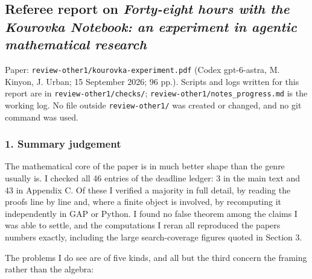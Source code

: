 \hypertarget{review-md-referee-report-on-forty-eight-hours-with-the-kourovka-notebook-an-experiment-in-agentic-mathematical-research}{%
\subsection*{\texorpdfstring{Referee report on \emph{Forty-eight hours
with the Kourovka Notebook: an experiment in agentic mathematical
research}}{Referee report on Forty-eight hours with the Kourovka Notebook: an experiment in agentic mathematical research}}\label{review-md-referee-report-on-forty-eight-hours-with-the-kourovka-notebook-an-experiment-in-agentic-mathematical-research}}

Paper: \nolinkurl{review-other1/kourovka-experiment.pdf} (Codex
gpt-6-astra, M. Kinyon, J. Urban; 15 September 2026; 96 pp.). Scripts
and logs written for this report are in
\nolinkurl{review-other1/checks/};
\nolinkurl{review-other1/notes_progress.md} is the working log. No file
outside \nolinkurl{review-other1/} was created or changed, and no git
command was used.

\hypertarget{review-md-summary-judgement}{%
\subsubsection*{1. Summary
judgement}\label{review-md-summary-judgement}}

The mathematical core of the paper is in much better shape than the
genre usually is. I checked all 46 entries of the deadline ledger: 3 in
the main text and 43 in Appendix C. Of these I verified a majority in
full detail, by reading the proofs line by line and, where a finite
object is involved, by recomputing it independently in GAP or Python. I
found no false theorem among the claims I was able to settle, and the
computations I reran all reproduced the paper\textquotesingle s numbers
exactly, including the large search-coverage figures quoted in Section
3.

The problems I do see are of five kinds, and all but the third concern
the framing rather than the algebra:

